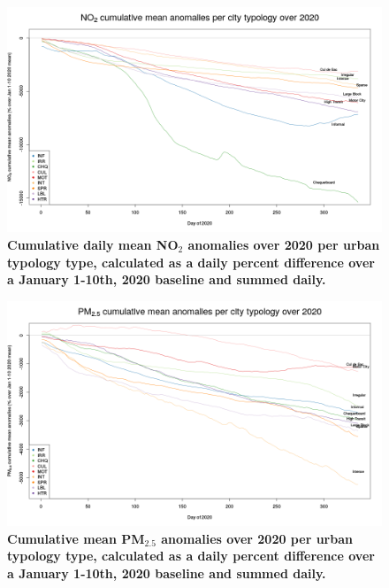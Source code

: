 \documentclass[preprint,12pt]{elsarticle}
\begin{document}
\begin{figure}
\centering
\includegraphics[trim={0 19 22 43},clip,scale=0.45]{Images/no2CulmReductionClusterMean_2020.png}
\caption{\bf Cumulative daily mean NO$_{2}$ anomalies over 2020 per urban typology type, calculated as a daily percent difference over a January 1-10th, 2020 baseline and summed daily. }
 \label{fig:no2}
\end{figure}

\begin{figure}
\centering
\includegraphics[trim={0 19 22 43},clip,scale=0.45]{Images/pm25CulmReductionClusterMean_2020_filteredAnomalies.png}
\caption{\bf  Cumulative mean PM$_{2.5}$ anomalies over 2020 per urban typology type, calculated as a daily percent difference over a January 1-10th, 2020 baseline and summed daily.}
 \label{fig:pm25}
\end{figure}
\end{document}
